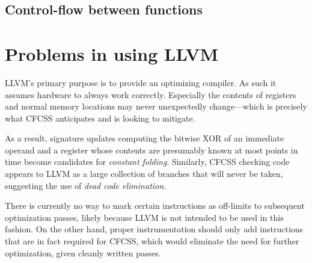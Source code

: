 \subsection{Control-flow between functions}



\section{Problems in using LLVM}

LLVM's primary purpose is to provide an optimizing compiler. As such it assumes
hardware to always work correctly. Especially the contents of registers and
normal memory locations may never unexpectedly change—which is precisely what
CFCSS anticipates and is looking to mitigate.

As a result, signature updates computing the bitwise XOR of an immediate
operand and a register whose contents are presumably known at most points in
time become candidates for \emph{constant folding}. Similarly, CFCSS checking
code appears to LLVM as a large collection of branches that will never be
taken, suggesting the use of \emph{dead code elimination}.

There is currently no way to mark certain instructions as off-limits to
subsequent optimization passes, likely because LLVM is not intended to be used
in this fashion. On the other hand, proper instrumentation should only add
instructions that are in fact required for CFCSS, which would eliminate the
need for further optimization, given cleanly written passes.


